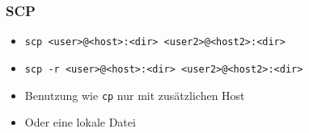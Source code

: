 \begin{frame}
\frametitle{SCP}
\begin{itemize}
\item \texttt{scp <user>@<host>:<dir> <user2>@<host2>:<dir>}
\pause
\item \texttt{scp -r <user>@<host>:<dir> <user2>@<host2>:<dir>}
\pause
\item Benutzung wie \texttt{cp} nur mit zusätzlichen Host
\pause
\item Oder eine lokale Datei
\end{itemize}
\end{frame}